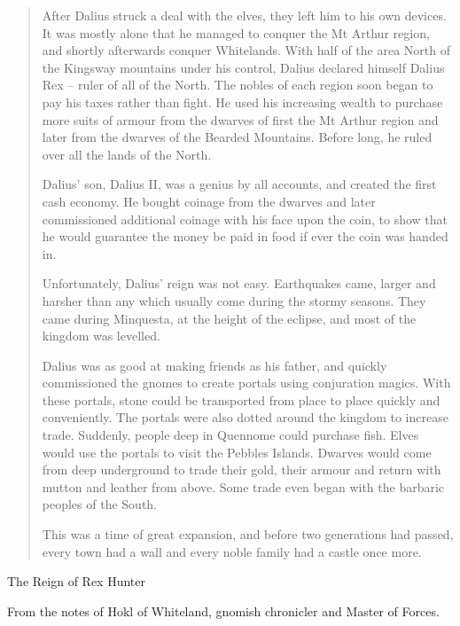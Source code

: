 \begin{quotation}

After Dalius struck a deal with the elves, they left him to his own devices.  It was mostly alone that he managed to conquer the Mt Arthur region, and shortly afterwards conquer Whitelands.  With half of the area North of the Kingsway mountains under his control, Dalius declared himself Dalius Rex -- ruler of all of the North.  The nobles of each region soon began to pay his taxes rather than fight.  He used his increasing wealth to purchase more suits of armour from the dwarves of first the Mt Arthur region and later from the dwarves of the Bearded Mountains.  Before long, he ruled over all the lands of the North.

	Dalius' son, Dalius II, was a genius by all accounts, and created the first cash economy.  He bought coinage from the dwarves and later commissioned additional coinage with his face upon the coin, to show that he would guarantee the money be paid in food if ever the coin was handed in.

	Unfortunately, Dalius' reign was not easy.  Earthquakes came, larger and harsher than any which usually come during the stormy seasons.  They came during Minquesta, at the height of the eclipse, and most of the kingdom was levelled.

	Dalius was as good at making friends as his father, and quickly commissioned the gnomes to create portals using conjuration magics.  With these portals, stone could be transported from place to place quickly and conveniently.  The portals were also dotted around the kingdom to increase trade.  Suddenly, people deep in Quennome could purchase fish.  Elves would use the portals to visit the Pebbles Islands.  Dwarves would come from deep underground to trade their gold, their armour and return with mutton and leather from above.  Some trade even began with the barbaric peoples of the South.

	This was a time of great expansion, and before two generations had passed, every town had a wall and every noble family had a castle once more.
\end{quotation}


The Reign of Rex Hunter

From the notes of Hokl of Whiteland, gnomish chronicler and Master of Forces.

